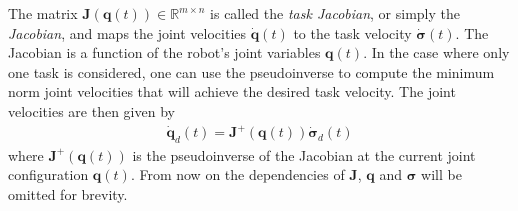 The matrix $\bm{J}(\bm{q}(t)) \in \mathbb{R}^{m \times n}$ is called the
\emph{task Jacobian}, or simply the \emph{Jacobian}, and maps the joint
velocities $\dot{\bm{q}}(t)$ to the task velocity $\dot{\bm{\sigma}}(t)$.
The Jacobian is a function of the robot's joint variables $\bm{q}(t)$.
In the case where only one task is considered, one can use the pseudoinverse
to compute the minimum norm joint velocities that will achieve the desired
task velocity. The joint velocities are then given by
\begin{align}
    \dot{\bm{q}}_d(t) = \bm{J}^{+}(\bm{q}(t)) \dot{\bm{\sigma}}_d(t) \label{eq:task_priority}
\end{align}
where $\bm{J}^{+}(\bm{q}(t))$ is the pseudoinverse of the Jacobian at the current
joint configuration $\bm{q}(t)$. From now on the dependencies of $\bm{J}$, $\bm{q}$
and $\bm{\sigma}$ will be omitted for brevity.


